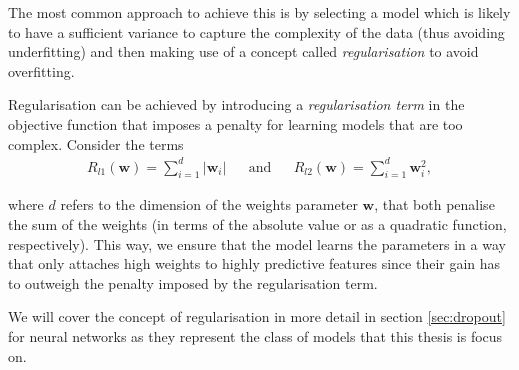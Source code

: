 The most common approach to achieve this is by selecting a model which is likely to have a sufficient variance to capture the complexity of the data (thus avoiding underfitting) and then making use of a concept called \emph{regularisation} to avoid overfitting. 

Regularisation can be achieved by introducing a \emph{regularisation term} in the objective function that imposes a penalty for learning models that are too complex. Consider the terms 
\begin{align} 
R_{l1}(\mathbf{w}) = \sum_{i=1}^{d}  \lvert \mathbf{w}_i \lvert  && \text{and} &&R_{l2}(\mathbf{w}) = \sum_{i=1}^{d}  \mathbf{w}_i^2,
\end{align} 

where $d$ refers to the dimension of the weights parameter $\mathbf{w}$, that both penalise the sum of the weights (in terms of the absolute value or as a quadratic function, respectively). This way, we ensure that the model learns the parameters in a way that only attaches high weights to highly predictive features since their gain has to outweigh the penalty imposed by the regularisation term. 
 
We will cover the concept of regularisation in more detail in section \ref{sec:dropout} for neural networks as they represent the class of models that this thesis is focus on. 


%
%










